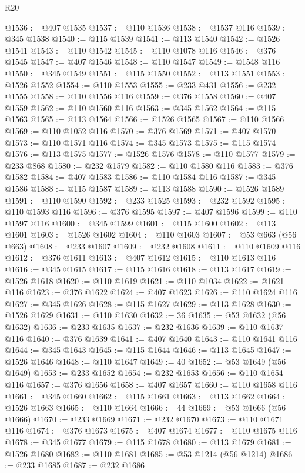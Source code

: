 \begin{lexlean}{R20}
\begin{coremodule}
@1536 := @407 @1535
@1537 := @110 @1536
@1538 := @1537 @116
@1539 := @345 @1538
@1540 := @115 @1539
@1541 := @113 @1540
@1542 := @1526 @1541
@1543 := @110 @1542
@1545 := @110 @1078 @116
@1546 := @376 @1545
@1547 := @407 @1546
@1548 := @110 @1547
@1549 := @1548 @116
@1550 := @345 @1549
@1551 := @115 @1550
@1552 := @113 @1551
@1553 := @1526 @1552
@1554 := @110 @1553
@1555 := @233 @431
@1556 := @232 @1555
@1558 := @110 @1556 @116
@1559 := @376 @1558
@1560 := @407 @1559
@1562 := @110 @1560 @116
@1563 := @345 @1562
@1564 := @115 @1563
@1565 := @113 @1564
@1566 := @1526 @1565
@1567 := @110 @1566
@1569 := @110 @1052 @116
@1570 := @376 @1569
@1571 := @407 @1570
@1573 := @110 @1571 @116
@1574 := @345 @1573
@1575 := @115 @1574
@1576 := @113 @1575
@1577 := @1526 @1576
@1578 := @110 @1577
@1579 := @233 @868
@1580 := @232 @1579
@1582 := @110 @1580 @116
@1583 := @376 @1582
@1584 := @407 @1583
@1586 := @110 @1584 @116
@1587 := @345 @1586
@1588 := @115 @1587
@1589 := @113 @1588
@1590 := @1526 @1589
@1591 := @110 @1590
@1592 := @233 @1525
@1593 := @232 @1592
@1595 := @110 @1593 @116
@1596 := @376 @1595
@1597 := @407 @1596
@1599 := @110 @1597 @116
@1600 := @345 @1599
@1601 := @115 @1600
@1602 := @113 @1601
@1603 := @1526 @1602
@1604 := @110 @1603
@1607 := @53 @663 (@56 @663)
@1608 := @233 @1607
@1609 := @232 @1608
@1611 := @110 @1609 @116
@1612 := @376 @1611
@1613 := @407 @1612
@1615 := @110 @1613 @116
@1616 := @345 @1615
@1617 := @115 @1616
@1618 := @113 @1617
@1619 := @1526 @1618
@1620 := @110 @1619
@1621 := @110 @1034
@1622 := @1621 @116
@1623 := @376 @1622
@1624 := @407 @1623
@1626 := @110 @1624 @116
@1627 := @345 @1626
@1628 := @115 @1627
@1629 := @113 @1628
@1630 := @1526 @1629
@1631 := @110 @1630
@1632 := 36
@1635 := @53 @1632 (@56 @1632)
@1636 := @233 @1635
@1637 := @232 @1636
@1639 := @110 @1637 @116
@1640 := @376 @1639
@1641 := @407 @1640
@1643 := @110 @1641 @116
@1644 := @345 @1643
@1645 := @115 @1644
@1646 := @113 @1645
@1647 := @1526 @1646
@1648 := @110 @1647
@1649 := 40
@1652 := @53 @1649 (@56 @1649)
@1653 := @233 @1652
@1654 := @232 @1653
@1656 := @110 @1654 @116
@1657 := @376 @1656
@1658 := @407 @1657
@1660 := @110 @1658 @116
@1661 := @345 @1660
@1662 := @115 @1661
@1663 := @113 @1662
@1664 := @1526 @1663
@1665 := @110 @1664
@1666 := 44
@1669 := @53 @1666 (@56 @1666)
@1670 := @233 @1669
@1671 := @232 @1670
@1673 := @110 @1671 @116
@1674 := @376 @1673
@1675 := @407 @1674
@1677 := @110 @1675 @116
@1678 := @345 @1677
@1679 := @115 @1678
@1680 := @113 @1679
@1681 := @1526 @1680
@1682 := @110 @1681
@1685 := @53 @1214 (@56 @1214)
@1686 := @233 @1685
@1687 := @232 @1686

\end{coremodule}
\end{lexlean}
